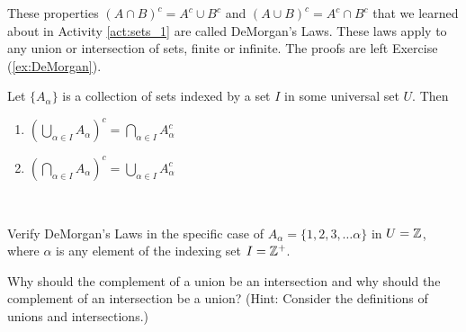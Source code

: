 These properties $(A \cap B)^c = A^c \cup B^c$ and $(A \cup B)^c = A^c \cap B^c$ that we learned about in Activity \ref{act:sets_1} are called DeMorgan's Laws. These laws apply to any union or intersection of sets, finite or infinite. The proofs are left Exercise (\ref{ex:DeMorgan}).   

\begin{theorem} Let $\{A_{\alpha}\}$ is a collection of sets indexed by a set $I$ in some universal set $U$. Then 
\begin{enumerate}
\item $\displaystyle \left(\bigcup_{\alpha \in I} A_{\alpha}\right)^c = \bigcap_{\alpha \in I} A_{\alpha}^c$ 
\item $\displaystyle \left(\bigcap_{\alpha \in I} A_{\alpha}\right)^c = \bigcup_{\alpha \in I} A_{\alpha}^c$ 
\end{enumerate}
\end{theorem}

\begin{activity} ~
\ba
\item Verify DeMorgan's Laws in the specific case of $A_{\alpha} = \{1, 2, 3, \ldots \alpha\}$ in $U = \mathbb{Z}$, where $\alpha$ is any element of the indexing set $I = \mathbb{Z}^+$. 

\item Why should the complement of a union be an intersection and why should the complement of an intersection be a union? (Hint: Consider the definitions of unions and intersections.)

\ea

\end{activity}

\begin{comment}

\ActivitySolution 

\ba

\item Let $\Z^- = \{n \in \Z \mid n < 0\}$. First note that $A_{\alpha}^c = \Z^- \cup \{0\} \cup \{\alpha+1, \alpha+2, \ldots\}$. So $\bigcap_{\alpha \in I} A_{\alpha}^c =  \Z^- \cup \{0\}$. Also, $\bigcup_{\alpha \in I} A_{\alpha} = \Z^+$, so $\left(\bigcup_{\alpha \in I} A_{\alpha}\right)^c = \Z^- \cup \{0\}$. 

Since $A_1^c = \Z \setminus \{1\}$, and $1$ is not an element of any $A_{\alpha}^c$, we have $\bigcup_{\alpha \in I} A_{\alpha}^c = \Z \setminus \{1\}$. Since $A_1 = \{1\}$, the only element common to all of the $A_{\alpha}$ is $1$, and $\bigcap_{\alpha \in I} A_{\alpha} = \{1\}$. So $\left(\bigcap_{\alpha \in I} A_{\alpha}\right)^c = \Z \setminus \{1\}$. 

\item Recall that a union is defined as an ``or" statement and an intersection is an ``and" statement. That is $A \cup B$ is the set of elements in $A$ or $B$, and $A \cap B$ is the set of elements in $A$ and $B$.  A complement is a negation, and the negation of ``$A$ or $B$" is ``(not $A$) and (not $B$)". Similarly, the negation of ``$A$ and $B$" is ``(not $A$) or (not $B$)".   

\ea

\end{comment}


